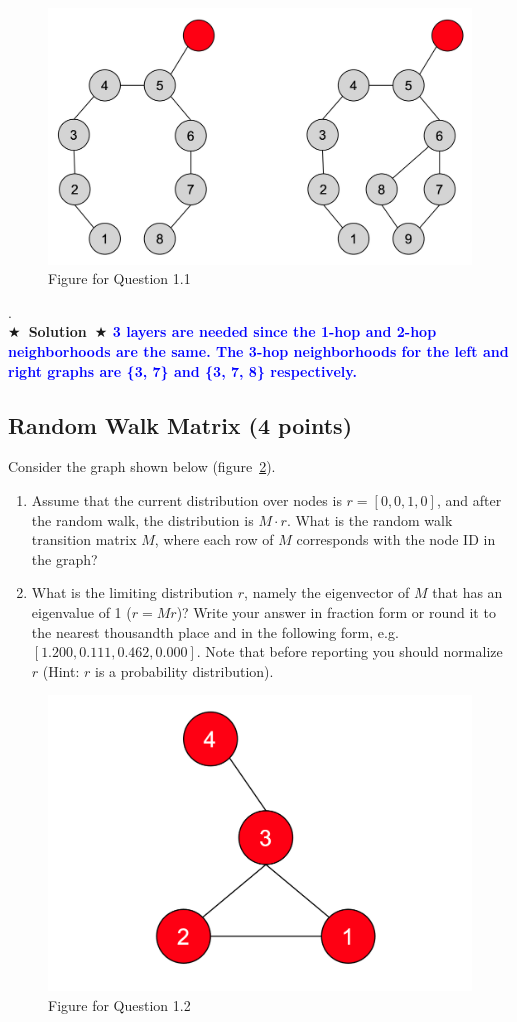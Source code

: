 \documentclass{article}
\numberwithin{figure}{section}
\newcommand{\Solution}[1]{{\medskip \color{red} \bf $\bigstar$~\sf \textbf{Solution}~$\bigstar$ \sf #1 } \bigskip}
\begin{document}
\\\\\\\\
\begin{figure}[!htb]
\centering
  \includegraphics[width=0.6\columnwidth]{CS224W_Homework1/fig4-1.png}
  \caption{Figure for Question 1.1}
  \label{fig:Q4.1}
\end{figure}

.\\

\Solution{\textcolor{blue}{3 layers are needed since the 1-hop and 2-hop neighborhoods are the same. The 3-hop neighborhoods for the left and right graphs are \{3, 7\} and \{3, 7, 8\} respectively.}
}

\subsection{Random Walk Matrix (4 points)}

Consider the graph shown below (figure~\ref{fig:Q4.2}).
\begin{enumerate}
    \item Assume that the current distribution over nodes is $r = [0,0,1,0]$, and after the random walk, the distribution is $M \cdot r$. What is the random walk transition matrix $M$, where each row of $M$ corresponds with the node ID in the graph?
    \item What is the limiting distribution $r$, namely the eigenvector of $M$ that has an eigenvalue of 1 ($r = Mr$)? Write your answer in fraction form or round it to the nearest thousandth place and in the following form, e.g. $[1.200, 0.111, 0.462, 0.000]$. Note that before reporting you should normalize $r$ (Hint: $r$ is a probability distribution).
\end{enumerate}

\begin{figure}[!htb]
\centering
  \includegraphics[width=0.5\columnwidth]{CS224W_Homework1/fig4-2.png}
  \caption{Figure for Question 1.2}
  \label{fig:Q4.2}
\end{figure}
\end{document}
